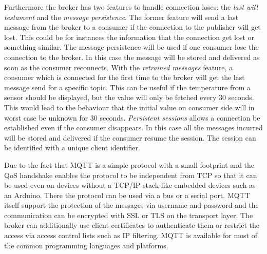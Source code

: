 Furthermore the broker has two features to handle connection loses: the \textit{last will testament} and the \textit{message persistence}.
The former feature will send a last message from the broker to a consumer if the connection to the publisher will get lost.
This could be for instances the information that the connection get lost or something similar.
The message persistence will be used if one consumer lose the connection to the broker.
In this case the message will be stored and delivered as soon as the consumer reconnects.
With the \textit{retrained messages} feature, a consumer which is connected for the first time to the broker will get the last message send for a specific topic. This can be useful if the temperature from a sensor should be displayed, but the value will only be fetched every 30 seconds. This would lead to the behaviour that the initial value on consumer side will in worst case be unknown for 30 seconds.
\textit{Persistent sessions} allows a connection be established even if the consumer disappears. In this case all the messages incurred will be stored and delivered if the consumer resume the session. The session can be identified with a unique client identifier.\autocite[cf.]{Bayer:MQTT}

Due to the fact that \ac{MQTT} is a simple protocol with a small footprint and the \ac{QoS} handshake enables the protocol to be independent from \acs{TCP} so that it can be used even on devices without a TCP/IP stack like embedded devices such as an Arduino.\autocite[cf.]{Bayer:MQTT}
There the protocol can be used via a bus or a serial port.\autocite[cf.]{Bayer:MQTT}
\ac{MQTT} itself support the protection of the messages via username and password and the communication can be encrypted with \acs{SSL} or \acs{TLS} on the transport layer.\autocite[cf.]{Bayer:MQTT}
The broker can additionally use client certificates to authenticate them or restrict the access via access control lists such as \acs{IP} filtering.\autocite[cf.]{Bayer:MQTT}
\ac{MQTT} is available for most of the common programming languages and platforms.


